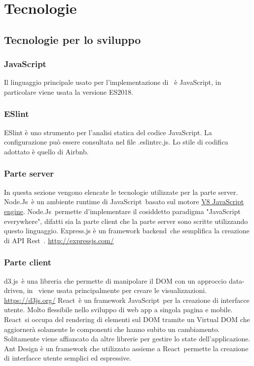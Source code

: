 \section{Tecnologie}
    \subsection{Tecnologie per lo sviluppo}
    \subsubsection{JavaScript}
        Il linguaggio principale usato per l'implementazione di \hd\ è JavaScript\glo , in particolare viene usata la versione ES2018.
    \subsubsection{ESlint}
        ESlint è uno strumento per l'analisi statica del codice JavaScript\glo . La configurazione può essere consultata nel file .eslintrc.js. Lo stile di codifica adottato è quello di Airbnb.
    \subsubsection{Parte server}
    In questa sezione vengono elencate le tecnologie utilizzate per la parte server.
        Node.Js\glo\ è un ambiente runtime di JavaScript\glo\ basato sul motore \href{https://v8.dev/}{V8 JavaScript engine}. Node.Js\glo\ permette d'implementare il cosiddetto paradigma "JavaScript everywhere", difatti sia la parte client che la parte server sono scritte utilizzando questo linguaggio.
        Express.js è un framework backend\glo\ che semplifica la creazione di API Rest\glo\ .
        \href{http://expressjs.com/}{http://expressjs.com/}
    \subsubsection{Parte client}
        d3.js\glo\ è una libreria che permette di manipolare il DOM con un approccio data-driven, in \hd\ viene usata principalmente per creare le visualizzazioni.
        \href{https://d3js.org/}{https://d3js.org/}
        React\glo\ è un framework JavaScript\glo\ per la creazione di interfacce utente. Molto flessibile nello sviluppo di web app a singola pagina e mobile. React\glo\ si occupa del rendering di elementi sul DOM tramite un Virtual DOM che aggiornerà  solamente le componenti che hanno subito un cambiamento. Solitamente viene affiancato da altre librerie per gestire lo state dell'applicazione.
        Ant Design è un framework che utilizzato assieme a React\glo\ permette la creazione di interfacce utente semplici ed espressive.
